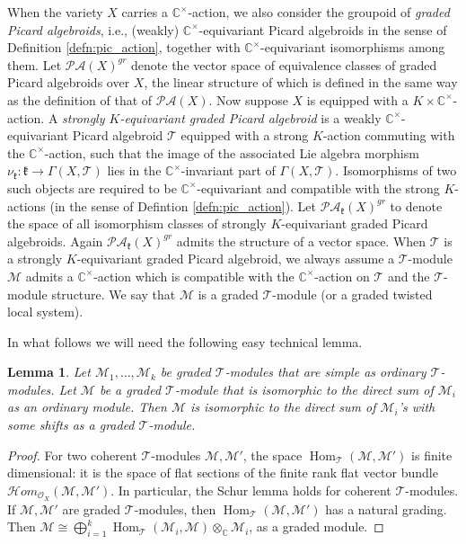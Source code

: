 \documentclass[12pt]{amsart}
\newcommand{\C}{\mathbb{C}}
\newcommand{\M}{\mathcal{M}}
\newcommand{\kf}{\mathfrak{k}}
\newcommand{\TT}{\mathscr{T}}
\newcommand{\pic}{\mathscr{PA}}
\newcommand{\cm}{\C^\times}
\newtheorem{Lem}[Thm]{Lemma}
\theoremstyle{definition}
\numberwithin{equation}{section}
\begin{document}
When the variety $X$ carries a $\cm$-action, we also consider the groupoid of {\it graded Picard algebroids}, i.e., (weakly) $\cm$-equivariant Picard algebroids in the sense of Definition \ref{defn:pic_action}, together with $\cm$-equivariant isomorphisms among them. Let $\pic(X)^{gr}$ denote the vector space of equivalence classes of graded Picard algebroids over $X$, the linear structure of which is defined in the same way as the definition of that of $\pic(X)$. Now suppose $X$ is equipped with a $K \times \cm$-action. A \emph{strongly $K$-equivariant graded Picard algebroid} is a weakly $\cm$-equivariant Picard algebroid $\TT$ equipped with a strong $K$-action commuting with the $\cm$-action, such that the image of the associated Lie algebra morphism $\nu_\kf: \kf \to \Gamma(X, \TT)$ lies in the $\cm$-invariant part of $\Gamma(X, \TT)$. Isomorphisms of two such objects are required to be $\cm$-equivariant and compatible with the strong $K$-actions (in the sense of Defintion \ref{defn:pic_action}).  Let $\pic_\kf(X)^{gr}$ to denote the space of all isomorphism classes of strongly $K$-equivariant graded Picard algebroids. Again $\pic_\kf(X)^{gr}$ admits the structure of a vector space. When $\TT$ is a strongly $K$-equivariant graded Picard algebroid, we always assume a $\TT$-module  $\M$ admits a $\cm$-action which is compatible with the $\cm$-action on $\TT$ and the $\TT$-module structure.
We say that $\M$ is a graded $\TT$-module (or a graded twisted local system).

In what follows we will need the following easy technical lemma.

\begin{Lem}\label{Lem:graded_loc_sys}
Let $\M_1,\ldots,\M_k$ be graded $\TT$-modules that are simple as ordinary $\TT$-modules.
Let $\M$ be a graded $\TT$-module that is isomorphic to the direct sum of $\M_i$
as an ordinary module. Then $\M$ is isomorphic to the direct sum of $\M_i$'s with some shifts
as a graded $\TT$-module.
\end{Lem}
\begin{proof}
For two coherent $\TT$-modules $\M,\M'$, the space $\operatorname{Hom}_{\TT}(\M,\M')$ is finite
dimensional: it is the space of flat sections of the finite rank flat vector bundle $\mathcal{H}om_{\mathcal{O}_X}(\M,\M')$. In particular, the Schur lemma holds for
coherent $\TT$-modules. If $\M,\M'$ are graded $\TT$-modules, then $\operatorname{Hom}_{\TT}(\M,\M')$
has a natural grading. Then $\M\cong \bigoplus_{i=1}^k \operatorname{Hom}_{\TT}(\M_i,\M)\otimes_{\C}\M_i$,
as a graded module.
\end{proof}
\end{document}
